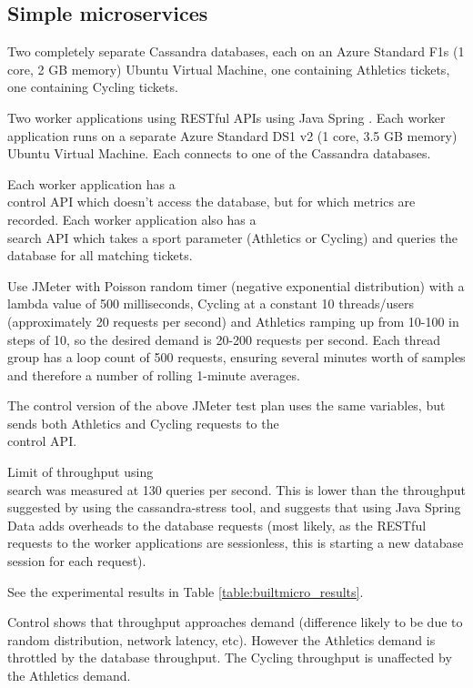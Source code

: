 \subsection{Simple microservices}
\begin{shaded}
Two completely separate Cassandra databases, each on an Azure Standard F1s (1 core, 2 GB memory) Ubuntu Virtual Machine, one containing Athletics tickets, one containing Cycling tickets.

Two worker applications using RESTful APIs using Java Spring \cite{RN1076}.  Each worker application runs on a separate Azure Standard DS1 v2 (1 core, 3.5 GB memory) Ubuntu Virtual Machine.  Each connects to one of the Cassandra databases.

Each worker application has a \\control API which doesn't access the database, but for which metrics are recorded.
Each worker application also has a \\search API which takes a sport parameter (Athletics or Cycling) and queries the database for all matching tickets.

Use JMeter with Poisson random timer (negative exponential distribution) with a lambda value of 500 milliseconds, Cycling at a constant 10 threads/users (approximately 20 requests per second) and Athletics ramping up from 10-100 in steps of 10, so the desired demand is 20-200 requests per second.  Each thread group has a loop count of 500 requests, ensuring several minutes worth of samples and therefore a number of rolling 1-minute averages.

The control version of the above JMeter test plan uses the same variables, but sends both Athletics and Cycling requests to the \\control API.

Limit of throughput using \\search was measured at 130 queries per second.  This is lower than the throughput suggested by using the cassandra-stress tool, and suggests that using Java Spring Data adds overheads to the database requests (most likely, as the RESTful requests to the worker applications are sessionless, this is starting a new database session for each request).

See the experimental results in Table \ref{table:builtmicro_results}.

Control shows that throughput approaches demand (difference likely to be due to random distribution, network latency, etc).  However the Athletics demand is throttled by the database throughput.  The Cycling throughput is unaffected by the Athletics demand. 
\end{shaded}
